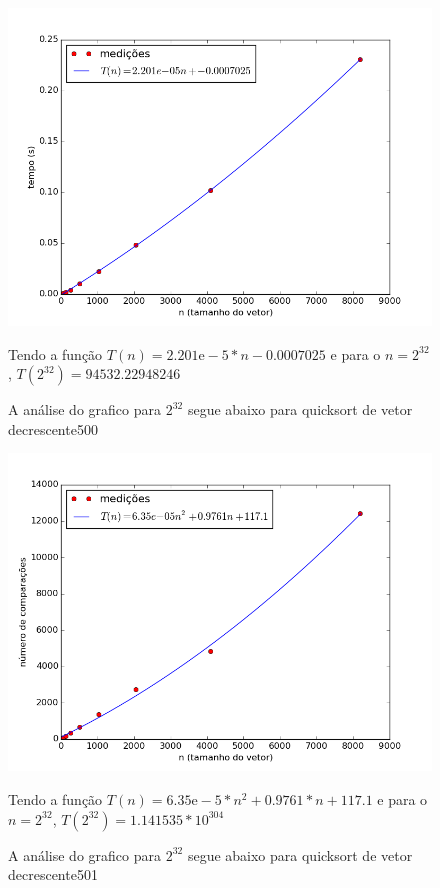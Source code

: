 \documentclass[12pt,a4paper,twoside]{report}
\begin{document}


\begin{figure}[ht]
\centering \includegraphics[scale=0.8]{../quicksort/imagens/quicksortQuaseDecresc500.png}
\caption{A análise do grafico para $2^{32}$ segue abaixo para quicksort de vetor decrescente500}

Tendo a função $T(n) = 2.201\mathrm{e}-5*n-0.0007025$ e para o $n =2^{32}$, $T(2^{32}) = 94532.22948246$

\label{fig:quicksortQuaseDecresc500}
\end{figure}

\begin{figure}[ht]
\centering \includegraphics[scale=0.8]{../quicksort/imagens/quicksortQuaseDecresc501.png}
\caption{A análise do grafico para $2^{32}$ segue abaixo para quicksort de vetor decrescente501}

Tendo a função $T(n) = 6.35\mathrm{e}-5*n^2+0.9761*n+117.1$ e para o $n =2^{32}$, $T(2^{32}) = 1.141535*10^{304}$

\label{fig:quicksortQuaseDecresc501}
\end{figure}
\end{document}
